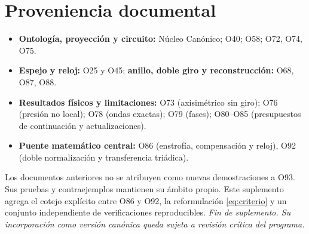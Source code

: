 \documentclass[11pt,a4paper]{article}
\theoremstyle{definition}\newtheorem{defi}[teo]{Definición}
\begin{document}
\section{Proveniencia documental}
\begin{itemize}
\item \textbf{Ontología, proyección y circuito:} Núcleo Canónico; O40; O58; O72, O74, O75.
\item \textbf{Espejo y reloj:} O25 y O45; \textbf{anillo, doble giro y reconstrucción:} O68, O87, O88.
\item \textbf{Resultados físicos y limitaciones:} O73 (axisimétrico sin giro); O76 (presión no local); O78 (ondas exactas); O79 (fases); O80--O85 (presupuestos de continuación y actualizaciones).
\item \textbf{Puente matemático central:} O86 (enstrofía, compensación y reloj), O92 (doble normalización y transferencia triádica).
\end{itemize}
Los documentos anteriores no se atribuyen como nuevas demostraciones a O93. Sus pruebas y contraejemplos mantienen su ámbito propio. Este suplemento agrega el cotejo explícito entre O86 y O92, la reformulación \eqref{eq:criterio} y un conjunto independiente de verificaciones reproducibles.
\vfill\noindent\textit{Fin de suplemento. Su incorporación como versión canónica queda sujeta a revisión crítica del programa.}
\end{document}
